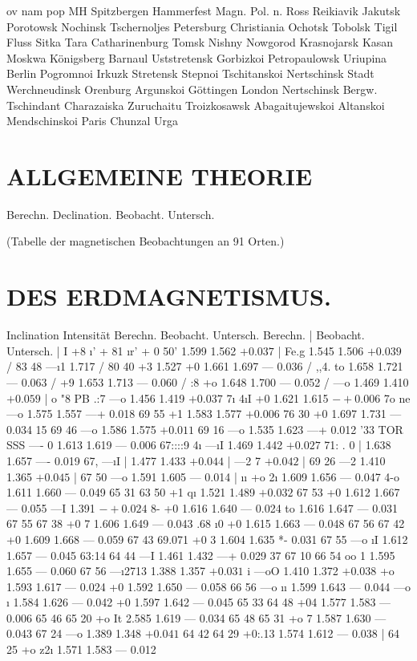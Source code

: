 \documentclass[12pt,a4paper]{article}
\begin{document}
\newpage


ov nam pop MH Spitzbergen Hammerfest Magn. Pol. n. Ross Reikiavik Jakutsk Porotowsk Nochinsk Tschernoljes Petersburg Christiania Ochotsk Tobolsk Tigil Fluss Sitka Tara Catharinenburg Tomsk Nishny Nowgorod Krasnojarsk Kasan Moskwa Königsberg Barnaul Uststretensk Gorbizkoi Petropaulowsk Uriupina Berlin Pogromnoi Irkuzk Stretensk Stepnoi Tschitanskoi Nertschinsk Stadt Werchneudinsk Orenburg Argunskoi Göttingen London Nertschinsk Bergw. Tschindant Charazaiska Zuruchaitu Troizkosawsk Abagaitujewskoi Altanskoi Mendschinskoi Paris Chunzal Urga

\section*{ALLGEMEINE THEORIE}
Berechn. Declination. Beobacht. Untersch.

(Tabelle der magnetischen Beobachtungen an 91 Orten.)


\newpage


\section*{DES ERDMAGNETISMUS.}
Inclination Intensität Berechn. Beobacht. Untersch. Berechn. | Beobacht. Untersch. | I +8\textdegree{} \i{}' + 81\textdegree{} \i{}r' + 0\textdegree{} 50' 1.599 1.562
$+ 0.037$
| Fe.g 1.545 1.506
$+ 0.039$
/ 83 48 ---\i{}1 1.717 / 80 40 +3 1.527 +0 1.661 1.697 --- 0.036 / ,,4. to 1.658 1.721 --- 0.063 / +9 1.653 1.713 --- 0.060 / :8 +o 1.648 1.700 --- 0.052 / ---o 1.469 1.410
$+ 0.059$
| o "8 PB .:7 ---o 1.456 1.419
$+ 0.037$
7\i{} 4\i{}I +0 1.621 1.615
$-+ 0.006$
7o ne ---o 1.575 1.557 ---+ 0.018 69 55 +1 1.583 1.577
$+ 0.006$
76 30 +0 1.697 1.731 --- 0.034 15 \textdegree{} 69 46 ---o 1.586 1.575
$+ 0.011$
69 16 ---o 1.535 1.623 ---+ 0.012 '33 TOR SSS ---- 0 1.613 1.619 --- 0.006 67::::9 4\i{} ---\i{}I 1.469 1.442
$+ 0.027$
71: . 0 | 1.638 1.657 ---- 0.019 67, ---\i{}I | 1.477 1.433
$+ 0.044$
| ---2 7%
$+ 0.042$
| 69 26 ---2 1.410 1.365
$+ 0.045$
| 67 50 ---o 1.591 1.605 --- 0.014 | \i{}\i{} +o 2\i{} 1.609 1.656 --- 0.047 4-o 1.611 1.660 --- 0.049 65 31 63 50 +1 q\i{} 1.521 1.489
$+ 0.032$
67 53 +0 1.612 1.667 --- 0.055 ---I 1.391
$-+ 0.024$
8- +0 1.616 1.640 --- 0.024 to 1.616 1.647 --- 0.031 67 55 67 38 +0 7 1.606 1.649 --- 0.043 .68 \i{}0 +0 1.615 1.663 --- 0.048 67 56 67 42 +0 1.609 1.668 --- 0.059 67 43 69.071 +0 3 1.604 1.635 *- 0.031 67 55 ---o \i{}I 1.612 1.657 --- 0.045 63:14 64 44 ---I 1.461 1.432 ---+ 0.029 37\textdegree{} 67 10 66 54 oo 1 1.595 1.655 --- 0.060 67 56 ---\i{}2713 1.388 1.357
$+ 0.031$
i ---oO 1.410 1.372
$+ 0.038$
+o 1.593 1.617 --- 0.024 +0 1.592 1.650 --- 0.058 66 56 ---o \i{}\i{} 1.599 1.643 --- 0.044 ---o \i{} 1.584 1.626 --- 0.042 +0 1.597 1.642 --- 0.045 65 33 64 48 +04 1.577 1.583 --- 0.006 65 46 65 20 +o It 2.585 1.619 --- 0.034 65 48 65 31 +o 7 1.587 1.630 --- 0.043 67 24 ---o 1.389 1.348
$+ 0.041$
64 42 64 29 +0:.13 1.574 1.612 --- 0.038 | 64 25 +o z2\i{} 1.571 1.583 --- 0.012
\end{document}
